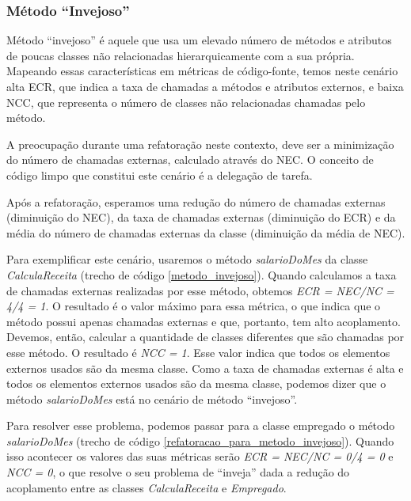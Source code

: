 \subsubsection{Método ``Invejoso''}
	
Método ``invejoso'' é aquele que usa um elevado número de métodos e atributos de poucas classes não relacionadas hierarquicamente com a sua própria. Mapeando essas características em métricas de código-fonte, temos neste cenário alta ECR, que indica a taxa de chamadas a métodos e atributos externos, e baixa NCC, que representa o número de classes não relacionadas chamadas pelo método.
	
A preocupação durante uma refatoração neste contexto, deve ser a minimização do número de chamadas externas, calculado através do NEC. O conceito de código limpo que constitui este cenário é a delegação de tarefa.
	
Após a refatoração, esperamos uma redução do número de chamadas externas (diminuição do NEC), da taxa de chamadas externas (diminuição do ECR) e da média do número de chamadas externas da classe (diminuição da média de NEC).
                      
Para exemplificar este cenário, usaremos o método \textit{salarioDoMes} da classe \textit{CalculaReceita} (trecho de código \ref{metodo_invejoso}). Quando calculamos a taxa de chamadas externas realizadas por esse método, obtemos \textit{ECR = NEC/NC = 4/4 = 1}. O resultado é o valor máximo para essa métrica, o que indica que o método possui apenas chamadas externas e que, portanto, tem alto acoplamento. Devemos, então, calcular a quantidade de classes diferentes que são chamadas por esse método. O resultado é \textit{NCC = 1}. Esse valor indica que todos os elementos externos usados são da mesma classe. Como a taxa de chamadas externas é alta e todos os elementos externos usados são da mesma classe, podemos dizer que o método \textit{salarioDoMes} está no cenário de método ``invejoso''.

                                      

Para resolver esse problema, podemos passar para a classe empregado o método \textit{salarioDoMes} (trecho de código \ref{refatoracao_para_metodo_invejoso}). Quando isso acontecer os valores das suas métricas serão \textit{ECR = NEC/NC = 0/4 = 0} e \textit{NCC = 0}, o que resolve o seu problema de ``inveja'' dada a redução do acoplamento entre as classes \textit{CalculaReceita} e \textit{Empregado}. 

